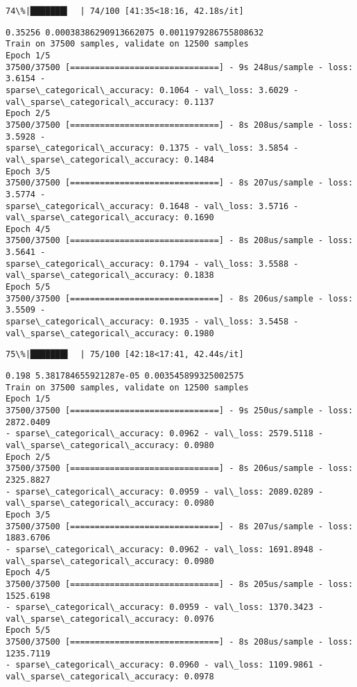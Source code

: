 \documentclass[11pt]{article}
\begin{document}
    \begin{Verbatim}[commandchars=\\\{\}]
 74\%|███████▍  | 74/100 [41:35<18:16, 42.18s/it]
    \end{Verbatim}

    \begin{Verbatim}[commandchars=\\\{\}]
0.35256 0.00038386290913662075 0.0011979286755808632
Train on 37500 samples, validate on 12500 samples
Epoch 1/5
37500/37500 [==============================] - 9s 248us/sample - loss: 3.6154 -
sparse\_categorical\_accuracy: 0.1064 - val\_loss: 3.6029 -
val\_sparse\_categorical\_accuracy: 0.1137
Epoch 2/5
37500/37500 [==============================] - 8s 208us/sample - loss: 3.5928 -
sparse\_categorical\_accuracy: 0.1375 - val\_loss: 3.5854 -
val\_sparse\_categorical\_accuracy: 0.1484
Epoch 3/5
37500/37500 [==============================] - 8s 207us/sample - loss: 3.5774 -
sparse\_categorical\_accuracy: 0.1648 - val\_loss: 3.5716 -
val\_sparse\_categorical\_accuracy: 0.1690
Epoch 4/5
37500/37500 [==============================] - 8s 208us/sample - loss: 3.5641 -
sparse\_categorical\_accuracy: 0.1794 - val\_loss: 3.5588 -
val\_sparse\_categorical\_accuracy: 0.1838
Epoch 5/5
37500/37500 [==============================] - 8s 206us/sample - loss: 3.5509 -
sparse\_categorical\_accuracy: 0.1935 - val\_loss: 3.5458 -
val\_sparse\_categorical\_accuracy: 0.1980
    \end{Verbatim}

    \begin{Verbatim}[commandchars=\\\{\}]
 75\%|███████▌  | 75/100 [42:18<17:41, 42.44s/it]
    \end{Verbatim}

    \begin{Verbatim}[commandchars=\\\{\}]
0.198 5.381784655921287e-05 0.003545899325002575
Train on 37500 samples, validate on 12500 samples
Epoch 1/5
37500/37500 [==============================] - 9s 250us/sample - loss: 2872.0409
- sparse\_categorical\_accuracy: 0.0962 - val\_loss: 2579.5118 -
val\_sparse\_categorical\_accuracy: 0.0980
Epoch 2/5
37500/37500 [==============================] - 8s 206us/sample - loss: 2325.8827
- sparse\_categorical\_accuracy: 0.0959 - val\_loss: 2089.0289 -
val\_sparse\_categorical\_accuracy: 0.0980
Epoch 3/5
37500/37500 [==============================] - 8s 207us/sample - loss: 1883.6706
- sparse\_categorical\_accuracy: 0.0962 - val\_loss: 1691.8948 -
val\_sparse\_categorical\_accuracy: 0.0980
Epoch 4/5
37500/37500 [==============================] - 8s 205us/sample - loss: 1525.6198
- sparse\_categorical\_accuracy: 0.0959 - val\_loss: 1370.3423 -
val\_sparse\_categorical\_accuracy: 0.0976
Epoch 5/5
37500/37500 [==============================] - 8s 208us/sample - loss: 1235.7119
- sparse\_categorical\_accuracy: 0.0960 - val\_loss: 1109.9861 -
val\_sparse\_categorical\_accuracy: 0.0978
    \end{Verbatim}
\end{document}
